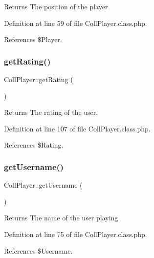 \begin{DoxyReturn}{Returns}
The position of the player 
\end{DoxyReturn}


Definition at line 59 of file Coll\+Player.\+class.\+php.



References \$\+Player.

\mbox{\label{class_coll_player_a59a6c6d2f1191c84f0c4f1cf227fb691}} 
\subsubsection{\texorpdfstring{get\+Rating()}{getRating()}}
{\footnotesize\ttfamily Coll\+Player\+::get\+Rating (\begin{DoxyParamCaption}{ }\end{DoxyParamCaption})}

\begin{DoxyReturn}{Returns}
The rating of the user. 
\end{DoxyReturn}


Definition at line 107 of file Coll\+Player.\+class.\+php.



References \$\+Rating.

\mbox{\label{class_coll_player_a7042b221470f22c2be46d97527585246}} 
\subsubsection{\texorpdfstring{get\+Username()}{getUsername()}}
{\footnotesize\ttfamily Coll\+Player\+::get\+Username (\begin{DoxyParamCaption}{ }\end{DoxyParamCaption})}

\begin{DoxyReturn}{Returns}
The name of the user playing 
\end{DoxyReturn}


Definition at line 75 of file Coll\+Player.\+class.\+php.



References \$\+Username.

